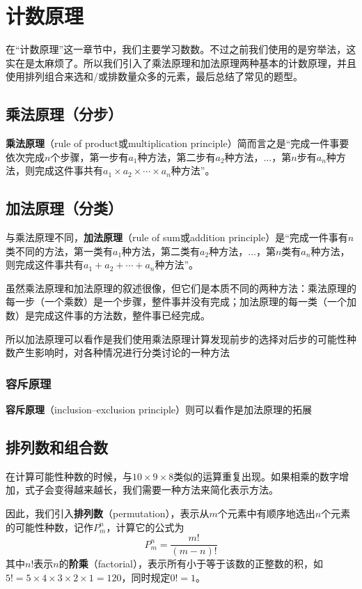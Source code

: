 \chapter{计数原理}
在“计数原理”这一章节中，我们主要学习数数。不过之前我们使用的是穷举法，这实在是太麻烦了。所以我们引入了乘法原理和加法原理两种基本的计数原理，并且使用排列组合来选和/或排数量众多的元素，最后总结了常见的题型。

\section[乘法原理]{乘法原理（分步）}
\textbf{乘法原理}（rule of product或multiplication principle）简而言之是“完成一件事要依次完成$n$个步骤，第一步有$a_1$种方法，第二步有$a_2$种方法，$\dots$，第$n$步有$a_n$种方法，则完成这件事共有$a_1\times a_2 \times\cdots\times a_n$种方法”。

\section[加法原理]{加法原理（分类）}
与乘法原理不同，\textbf{加法原理}（rule of sum或addition principle）是“完成一件事有$n$类不同的方法，第一类有$a_1$种方法，第二类有$a_2$种方法，$\dots$，第$n$类有$a_n$种方法，则完成这件事共有$a_1+a_2+\cdots+a_n$种方法”。

虽然乘法原理和加法原理的叙述很像，但它们是本质不同的两种方法：乘法原理的每一步（一个乘数）是一个步骤，整件事并没有完成；加法原理的每一类（一个加数）是完成这件事的方法数，整件事已经完成。

所以加法原理可以看作是我们使用乘法原理计算发现前步的选择对后步的可能性种数产生影响时，对各种情况进行分类讨论的一种方法

\subsection{容斥原理}
\textbf{容斥原理}（inclusion–exclusion principle）则可以看作是加法原理的拓展

\section{排列数和组合数}
在计算可能性种数的时候，与$10\times 9\times 8$类似的运算重复出现。如果相乘的数字增加，式子会变得越来越长，我们需要一种方法来简化表示方法。

因此，我们引入\textbf{排列数}（permutation），表示从$m$个元素中有顺序地选出$n$个元素的可能性种数，记作$P_m^n$，计算它的公式为\[P_m^n=\frac{m!}{(m-n)!}\]其中$n!$表示$n$的\textbf{阶乘}（factorial），表示所有小于等于该数的正整数的积，如$5!=5\times 4\times 3\times 2\times 1=120$，同时规定$0!=1$。

